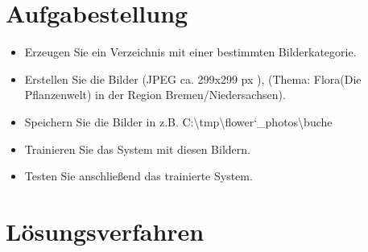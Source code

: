 \section{Aufgabestellung}
\begin{itemize}
    \item Erzeugen Sie ein Verzeichnis mit einer bestimmten Bilderkategorie.
    \item Erstellen Sie die Bilder (JPEG ca. 299x299 px ), (Thema: Flora(Die Pflanzenwelt) in der Region Bremen/Niedersachsen).

    \item Speichern Sie die Bilder in z.B. C:\textbackslash tmp\textbackslash flower\char`_photos\textbackslash buche
    \item Trainieren Sie das System mit diesen Bildern.
    \item Testen Sie anschließend das trainierte System.
\end{itemize}


\pagebreak

\section{Lösungsverfahren}

